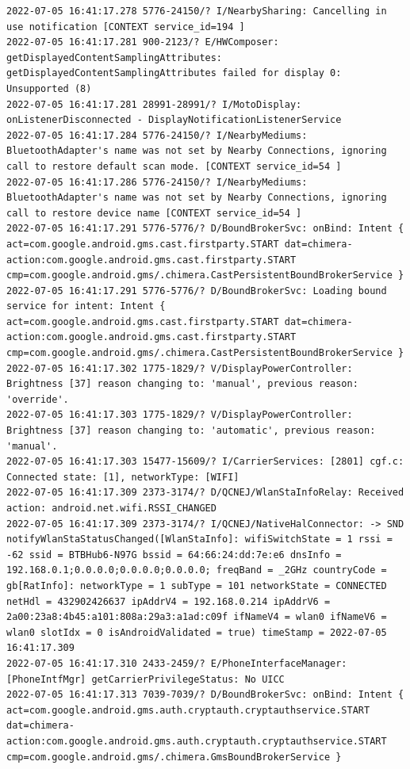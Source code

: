 \documentclass[a4paper,12pt]{book}
\begin{document}
\begin{lstlisting}
2022-07-05 16:41:17.278 5776-24150/? I/NearbySharing: Cancelling in use notification [CONTEXT service_id=194 ]
2022-07-05 16:41:17.281 900-2123/? E/HWComposer: getDisplayedContentSamplingAttributes: getDisplayedContentSamplingAttributes failed for display 0: Unsupported (8)
2022-07-05 16:41:17.281 28991-28991/? I/MotoDisplay: onListenerDisconnected - DisplayNotificationListenerService
2022-07-05 16:41:17.284 5776-24150/? I/NearbyMediums: BluetoothAdapter's name was not set by Nearby Connections, ignoring call to restore default scan mode. [CONTEXT service_id=54 ]
2022-07-05 16:41:17.286 5776-24150/? I/NearbyMediums: BluetoothAdapter's name was not set by Nearby Connections, ignoring call to restore device name [CONTEXT service_id=54 ]
2022-07-05 16:41:17.291 5776-5776/? D/BoundBrokerSvc: onBind: Intent { act=com.google.android.gms.cast.firstparty.START dat=chimera-action:com.google.android.gms.cast.firstparty.START cmp=com.google.android.gms/.chimera.CastPersistentBoundBrokerService }
2022-07-05 16:41:17.291 5776-5776/? D/BoundBrokerSvc: Loading bound service for intent: Intent { act=com.google.android.gms.cast.firstparty.START dat=chimera-action:com.google.android.gms.cast.firstparty.START cmp=com.google.android.gms/.chimera.CastPersistentBoundBrokerService }
2022-07-05 16:41:17.302 1775-1829/? V/DisplayPowerController: Brightness [37] reason changing to: 'manual', previous reason: 'override'.
2022-07-05 16:41:17.303 1775-1829/? V/DisplayPowerController: Brightness [37] reason changing to: 'automatic', previous reason: 'manual'.
2022-07-05 16:41:17.303 15477-15609/? I/CarrierServices: [2801] cgf.c: Connected state: [1], networkType: [WIFI]
2022-07-05 16:41:17.309 2373-3174/? D/QCNEJ/WlanStaInfoRelay: Received action: android.net.wifi.RSSI_CHANGED
2022-07-05 16:41:17.309 2373-3174/? I/QCNEJ/NativeHalConnector: -> SND notifyWlanStaStatusChanged([WlanStaInfo]: wifiSwitchState = 1 rssi = -62 ssid = BTBHub6-N97G bssid = 64:66:24:dd:7e:e6 dnsInfo = 192.168.0.1;0.0.0.0;0.0.0.0;0.0.0.0; freqBand = _2GHz countryCode = gb[RatInfo]: networkType = 1 subType = 101 networkState = CONNECTED netHdl = 432902426637 ipAddrV4 = 192.168.0.214 ipAddrV6 = 2a00:23a8:4b45:a101:808a:29a3:a1ad:c09f ifNameV4 = wlan0 ifNameV6 = wlan0 slotIdx = 0 isAndroidValidated = true) timeStamp = 2022-07-05 16:41:17.309
2022-07-05 16:41:17.310 2433-2459/? E/PhoneInterfaceManager: [PhoneIntfMgr] getCarrierPrivilegeStatus: No UICC
2022-07-05 16:41:17.313 7039-7039/? D/BoundBrokerSvc: onBind: Intent { act=com.google.android.gms.auth.cryptauth.cryptauthservice.START dat=chimera-action:com.google.android.gms.auth.cryptauth.cryptauthservice.START cmp=com.google.android.gms/.chimera.GmsBoundBrokerService }

\end{lstlisting}
\end{document}
